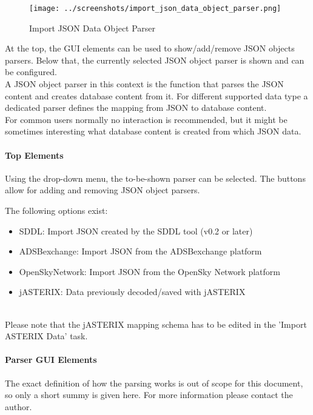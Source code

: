 \begin{figure}[H]
  \center
    \texttt{[image: ../screenshots/import\_json\_data\_object\_parser.png]}
  \caption{Import JSON Data Object Parser}
\end{figure}

At the top, the GUI elements can be used to show/add/remove JSON objects parsers. Below that, the currently selected JSON object parser is shown and can be configured. \\

A JSON object parser in this context is the function that parses the JSON content and creates database content from it. For different supported  data type a dedicated parser defines the mapping from JSON to database content. \\

For common users normally no interaction is recommended, but it might be sometimes interesting what database content is created from which JSON data.

\paragraph{Top Elements}

Using the drop-down menu, the to-be-shown parser can be selected. The buttons allow for adding and removing JSON object parsers.

The following options exist:
\begin{itemize}  
\item SDDL: Import JSON created by the SDDL tool (v0.2 or later)
\item ADSBexchange: Import JSON from the ADSBexchange platform
\item OpenSkyNetwork: Import JSON from the OpenSky Network platform
\item jASTERIX: Data previously decoded/saved with jASTERIX
\end{itemize}
\ \\

Please note that the jASTERIX mapping schema has to be edited in the 'Import ASTERIX Data' task.


\paragraph{Parser GUI Elements}

The exact definition of how the parsing works is out of scope for this document, so only a short summy is given here. For more information please contact the author.

